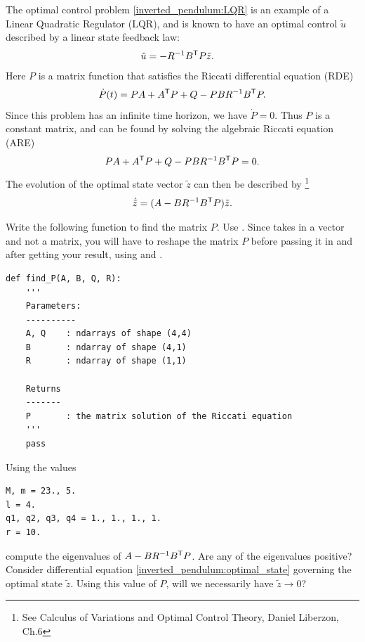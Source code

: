 The optimal control problem \eqref{inverted_pendulum:LQR} is an example of a Linear Quadratic Regulator (LQR), and is known to have an optimal control $\tilde{u}$ described by a linear state feedback law:
\begin{align*}
\tilde{u} &= -R^{-1}B^{\mathsf T} P\tilde{z}.
\end{align*}
Here $P$ is a matrix function that satisfies the Riccati differential equation (RDE)
\[
\dot{P}(t) = PA + A^{\mathsf T} P + Q - PBR^{-1}B^{\mathsf T}  P.  
\]
Since this problem has an infinite time horizon, we have $\dot{P} = 0$. Thus $P$ is a constant matrix, and can be found by solving the algebraic Riccati equation (ARE)
\begin{align}
 PA + A^{\mathsf T} P + Q - PBR^{-1}B^{\mathsf T}  P = 0.  \label{inverted_pendulum:ARE}
\end{align}
The evolution of the optimal state vector $\tilde{z}$ can then be described by \footnote{See Calculus of Variations and Optimal Control Theory, Daniel Liberzon, Ch.6}
\begin{align}
\dot{\tilde{z}} = (A - BR^{-1}B^{\mathsf T} P)\tilde{z}. \label{inverted_pendulum:optimal_state}
\end{align}

\begin{problem}
Write the following function to find the matrix $P$. 
Use . 
Since  takes in a vector and not a matrix, you will have to reshape the matrix $P$ before passing it in and after getting your result, using  and .
\begin{lstlisting}
def find_P(A, B, Q, R):
	'''
	Parameters:
	----------
	A, Q 	: ndarrays of shape (4,4)
	B		: ndarray of shape (4,1)
	R		: ndarray of shape (1,1)
	
	Returns
	-------
	P		: the matrix solution of the Riccati equation
	'''
	pass

\end{lstlisting}
Using the values 
\begin{lstlisting}
M, m = 23., 5.
l = 4.
q1, q2, q3, q4 = 1., 1., 1., 1.
r = 10.
\end{lstlisting}
compute the eigenvalues of $A - BR^{-1}B^{\mathsf T} P$.
Are any of the eigenvalues positive? 
Consider differential equation \eqref{inverted_pendulum:optimal_state} governing the optimal state $\tilde{z}$. 
Using this value of $P$, will we necessarily have $\tilde{z} \to 0$?
\end{problem}

